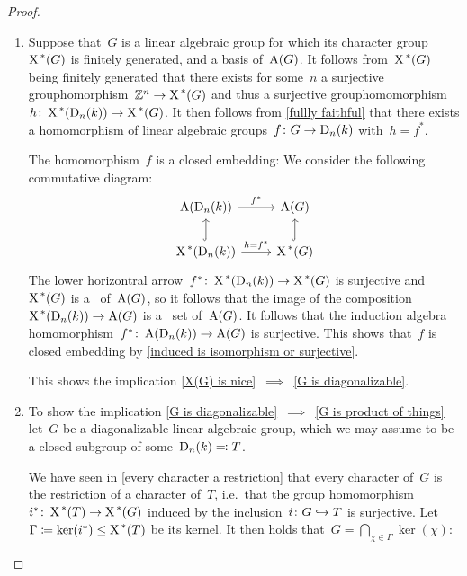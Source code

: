 \begin{proof}
\begin{enumerate}[label = Step~\arabic*]
    \item
      Suppose that~$G$ is a linear algebraic group for which its character group~$\operatorname{X}^{\,*}(G)$ is finitely generated, and a basis of~$\operatorname{A}(G)$.
      It follows from~$\operatorname{X}^{\,*}(G)$ being finitely generated that there exists for some~$n$ a surjective grouphomorphism~$\mathbb{Z}^n \to \operatorname{X}^{\,*}(G)$ and thus a surjective grouphomomorphism~$h \colon \operatorname{X}^{\,*}(\operatorname{D}_n(k)) \to \operatorname{X}^{\,*}(G)$.
      It then follows from \ref{fullly faithful} that there exists a homomorphism of linear algebraic groups~$f \colon G \to \operatorname{D}_n(k)$ with~$h = f^*$.
      
      The homomorphism~$f$ is a closed embedding:
      We consider the following commutative diagram:
      \[
        \begin{tikzcd}
            \coord(\Diag_n(k))
            \arrow{r}[above]{f^*}
          & \coord(G)
          \\
            \chargroup(\Diag_n(k))
            \arrow{r}[above]{h = f^*}
            \arrow[hook]{u}
          & \chargroup(G)
            \arrow[hook]{u}
        \end{tikzcd}
      \]
      The lower horizontral arrow~$f^* \colon \operatorname{X}^{\,*}(\operatorname{D}_n(k)) \to \operatorname{X}^{\,*}(G)$ is surjective and~$\operatorname{X}^{\,*}(G)$ is a~ of~$\operatorname{A}(G)$, so it follows that the image of the composition~$\operatorname{X}^{\,*}(\operatorname{D}_n(k)) \to \operatorname{A}(G)$ is a~ set of~$\operatorname{A}(G)$.
      It follows that the induction algebra homomorphism~$f^* \colon \operatorname{A}(\operatorname{D}_n(k)) \to \operatorname{A}(G)$ is surjective.
      This shows that~$f$ is closed embedding by \cref{induced is isomorphism or surjective}.
      
      This shows the implication \ref*{X(G) is nice}~$\implies$~\ref*{G is diagonalizable}.
      
    \item
      To show the implication \ref*{G is diagonalizable}~$\implies$~\ref*{G is product of things} let~$G$ be a diagonalizable linear algebraic group, which we may assume to be a closed subgroup of some~$\operatorname{D}_n(k) \eqqcolon T$.
      
      We have seen in \ref{every character a restriction} that every character of~$G$ is the restriction of a character of~$T$, i.e.\ that the group homomorphism~$i^* \colon \operatorname{X}^{\,*}(T) \to \operatorname{X}^{\,*}(G)$ induced by the inclusion~$i \colon G \hookrightarrow T$ is surjective.
      Let~$\Gamma \coloneqq \ker(i^*) \leq \operatorname{X}^{\,*}(T)$ be its kernel.
      It then holds that~$G = \bigcap_{\chi \in \Gamma} \ker(\chi)$:
      

\end{enumerate}
\end{proof}
